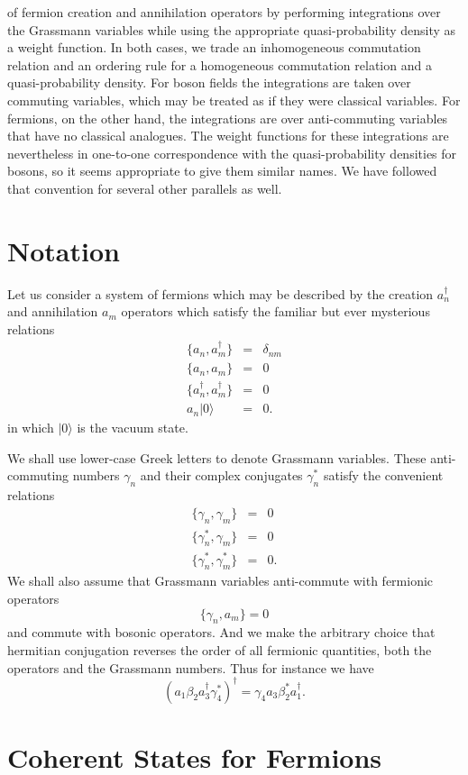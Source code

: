 \documentclass[12pt]{article}
\def\beq{\begin{equation}}
\def\eeq{\end{equation}}
\def\bea{\begin{eqnarray}}
\def\eea{\end{eqnarray}}
\def\ad{a^\dgr}
\def\b{\beta}
\def\sb{\beta^*}
\def\c{\gamma}
\def\sc{\gamma^*}
\def\d{\delta}
\def\dgr{\dagger}
\begin{document}
of fermion creation and annihilation operators 
by performing integrations over the Grassmann variables
while using the appropriate quasi-probability density
as a weight function.
In both cases, we trade an inhomogeneous commutation
relation and an ordering rule for a homogeneous commutation
relation and a quasi-probability density.
For boson fields the integrations
are taken over commuting variables,
which may be treated as if they were classical variables.
For fermions, on the other hand,
the integrations are over anti-commuting variables
that have no classical analogues.
The weight functions for these integrations
are nevertheless in one-to-one correspondence
with the quasi-probability densities for bosons,
so it seems appropriate to give them similar names.
We have followed that convention for several other
parallels as well.

\section{Notation}
Let us consider a system of fermions 
which may be described by
the creation $ a_n^\dgr $ and annihilation $ a_m $ operators
which satisfy the familiar but ever mysterious relations
\bea
\{ a_n , a_m^\dgr \} & = & \d_{nm} \\
\{ a_n , a_m  \} & = & 0 \\
\{ a_n^\dgr ,  a_m^\dgr \} & = & 0 \\
a_n | 0 \rangle & = & 0 .
\label {acrels}
\eea
in which $ | 0 \rangle $ is the vacuum state. 
\par
We shall use lower-case Greek letters 
to denote Grassmann variables.
These anti-commuting numbers
$ \c_n $ and their complex conjugates
$ \sc_n $ satisfy the convenient relations
\bea
\{ \c_n , \c_m  \} & = & 0 \\
\{ \sc_n , \c_m  \} & = & 0 \\
\{ \sc_n , \sc_m  \} & = & 0 .
\label {grels}
\eea
We shall also assume that Grassmann variables 
anti-commute with fermionic operators 
\beq
\{ \c_n , a_m \} = 0 
\label {gopa}
\eeq
and commute with bosonic operators.
And we make the arbitrary choice
that hermitian conjugation reverses
the order of all fermionic quantities,
both the operators and the Grassmann numbers.
Thus for instance
we have
\beq
\left( a_1 \b_2 \ad_3 \sc_4 \right)^\dgr
= \c_4 a_3 \sb_2 \ad_1 .
\label {exa}
\eeq

\section{Coherent States for Fermions}
\end{document}
